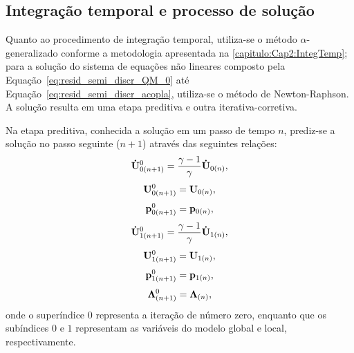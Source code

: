 \subsection{Integração temporal e processo de solução}

Quanto ao procedimento de integração temporal, utiliza-se o método $\alpha$-generalizado conforme a metodologia apresentada na \autoref{capitulo:Cap2:IntegTemp}; para a solução do sistema de equações não lineares composto pela Equação~\eqref{eq:resid_semi_discr_QM_0} até Equação~\eqref{eq:resid_semi_discr_acopla}, utiliza-se o método de Newton-Raphson. A solução resulta em uma etapa preditiva e outra iterativa-corretiva.

Na etapa preditiva, conhecida a solução em um passo de tempo $n$, prediz-se a solução no passo seguinte ($n+1$) através das seguintes relações:
\begin{align}
	\mathbf{\dot{U}}_{0(n+1)}^{0} = \frac{\gamma-1}{\gamma}\mathbf{\dot{U}}_{0(n)} \label{eq:pred_acel_0},
\end{align}
\begin{align}
	\mathbf{U}_{0(n+1)}^{0} = \mathbf{U}_{0(n)}, \label{eq:pred_vel_0}
\end{align}
\begin{align}
	\mathbf{p}_{0(n+1)}^{0} = \mathbf{p}_{0(n)},\label{eq:pred_press_0}
\end{align}
\begin{align}
	\mathbf{\dot{U}}_{1(n+1)}^{0} = \frac{\gamma-1}{\gamma}\mathbf{\dot{U}}_{1(n)} \label{eq:pred_acel_1},
\end{align}
\begin{align}
	\mathbf{U}_{1(n+1)}^{0} = \mathbf{U}_{1(n)}, \label{eq:pred_vel_1}
\end{align}
\begin{align}
	\mathbf{p}_{1(n+1)}^{0} = \mathbf{p}_{1(n)},\label{eq:pred_press_1}
\end{align}
\begin{align}
	\boldsymbol{\Lambda}_{(n+1)}^{0} = \boldsymbol{\Lambda}_{(n)},\label{eq:pred_lag_mult}
\end{align}
\noindent onde o superíndice $0$ representa a iteração de número zero, enquanto que os subíndices $0$ e $1$ representam as variáveis do modelo global e local, respectivamente.


